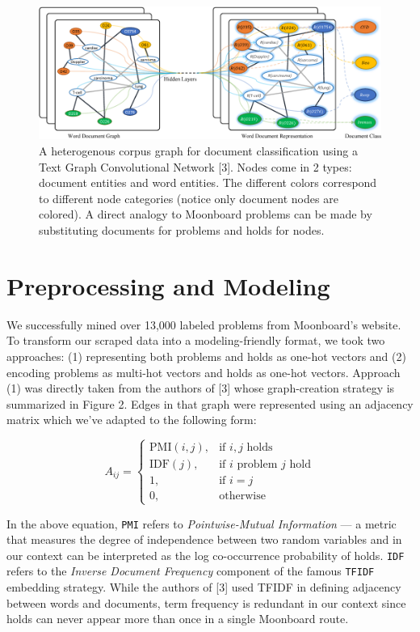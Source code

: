 \documentclass{article}
\begin{document}
\begin{figure}
\centering
\includegraphics[width=.7\linewidth]{textGCN}
\caption{A heterogenous corpus graph for document classification using a Text Graph Convolutional Network [3]. Nodes come in 2 types: document entities and word entities. The different colors correspond to different node categories (notice only document nodes are colored). A direct analogy to Moonboard problems can be made by substituting documents for problems and holds for nodes.}
\label{fig: Corpus graph for Text Graph Convolutional Network}
\end{figure}

\section{Preprocessing and Modeling}
We successfully mined over 13,000 labeled problems from Moonboard's website. To transform our scraped data into a modeling-friendly format, we took two approaches: (1) representing both problems and holds as one-hot vectors and (2) encoding problems as multi-hot vectors and holds as one-hot vectors. Approach (1) was directly taken from the authors of [3] whose graph-creation strategy is summarized in Figure 2. Edges in that graph were represented using an adjacency matrix which we've adapted to the following form:

\[
    A_{ij}= 
\begin{cases}
    \text{PMI}(i, j), & \text{if } i, j \text{ holds} \\
    \text{IDF}(j), & \text{if } i \text{ problem } j \text{ hold} \\
    1, & \text{if } i=j \\
    0, & \text{otherwise}
\end{cases}
\]

In the above equation, \texttt{PMI} refers to \textit{Pointwise-Mutual Information} --- a metric that measures the degree of independence between two random variables and in our context can be interpreted as the log co-occurrence probability of holds. \texttt{IDF} refers to the \textit{Inverse Document Frequency} component of the famous \texttt{TFIDF} embedding strategy. While the authors of [3] used TFIDF in defining adjacency between words and documents, term frequency is redundant in our context since holds can never appear more than once in a single Moonboard route.
\end{document}
